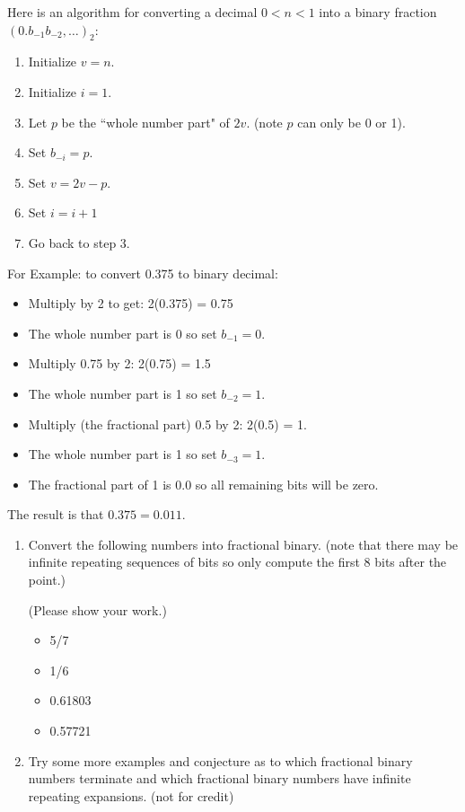 \documentclass[10pt,letterpaper,unboxed,cm]{article}
\begin{document}
\begin{enumerate}
\newpage

Here is an algorithm for converting a decimal $0<n<1$ into a binary fraction $(0.b_{-1}b_{-2},\dots)_2$:
\begin{enumerate}[1.]
\item
Initialize $v=n$.
\item
Initialize $i = 1$.
\item
Let $p$ be the ``whole number part" of $2v$. (note $p$ can only be 0 or 1).
\item
Set $b_{-i}=p$.
\item
Set $v=2v-p$.
\item
Set $i=i+1$
\item
Go back to step 3.
\end{enumerate}

For Example: to convert 0.375 to binary decimal:
\begin{itemize}
\item
Multiply by 2 to get: 2(0.375) = 0.75
\item
The whole number part is 0 so set $b_{-1}=0$.
\item
Multiply 0.75 by 2: 2(0.75) = 1.5
\item
The whole number part is 1 so set $b_{-2}=1$.
\item
Multiply (the fractional part) 0.5 by 2:
2(0.5) = 1.
\item
The whole number part is 1 so set $b_{-3}=1$.
\item
The fractional part of 1 is 0.0 so all remaining bits will be zero.
\end{itemize}
The result is that $0.375 = 0.011$.
\begin{enumerate}
\item 
Convert the following numbers into fractional binary. (note that there may be infinite repeating sequences of bits so only compute the first 8 bits after the point.)

(Please show your work.)
\begin{itemize}
\item
5/7
\item
1/6
\item
0.61803
\item
0.57721
\end{itemize}
\item
Try some more examples and conjecture as to which fractional binary numbers terminate and which fractional binary numbers have infinite repeating expansions. (not for credit)
\end{enumerate}
    


\end{enumerate}
\end{document}
